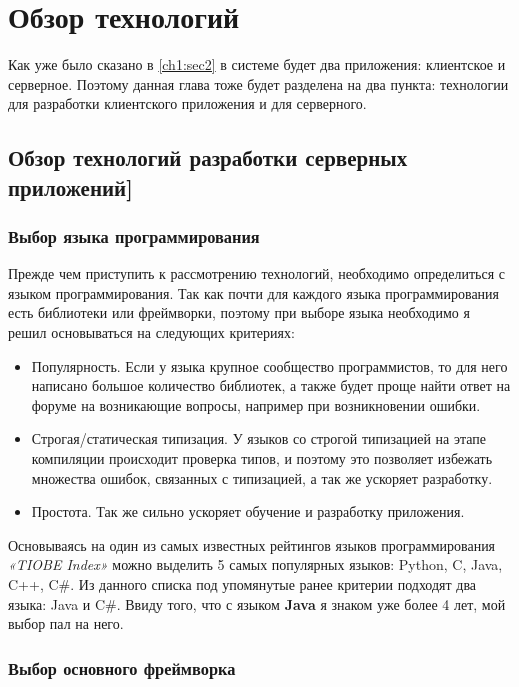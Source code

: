 \chapter{Обзор технологий} \label{ch2}
	
Как уже было сказано в \ref{ch1:sec2} в системе будет два приложения: клиентское и серверное. Поэтому данная глава тоже будет разделена на два пункта: технологии для разработки клиентского приложения и для серверного. 

\section{Обзор технологий разработки серверных приложений]} \label{ch2:sec1}

\subsection{Выбор языка программирования} \label{ch2:subsec11}

Прежде чем приступить к рассмотрению технологий, необходимо определиться с языком программирования. Так как почти для каждого языка программирования есть библиотеки или фреймворки, поэтому при выборе языка необходимо я решил основываться на следующих критериях:

\begin{itemize}
	\item Популярность. Если у языка крупное сообщество программистов, то для него написано большое количество библиотек, а также будет проще найти ответ на форуме на возникающие вопросы, например при возникновении ошибки.
	\item Строгая/статическая типизация. У языков со строгой типизацией на этапе компиляции происходит проверка типов, и поэтому это позволяет избежать множества ошибок, связанных с типизацией, а так же ускоряет разработку.  
	\item Простота. Так же сильно ускоряет обучение и разработку приложения.
\end{itemize}  

Основываясь на один из самых известных рейтингов языков программирования \textit{«TIOBE Index»}\cite{tiobe} можно выделить 5 самых популярных языков: Python, C, Java, C++, C\#. Из данного списка под упомянутые ранее критерии подходят два языка: Java и C\#. Ввиду того, что с языком \textbf{Java} я знаком уже более 4 лет, мой выбор пал на него.

\subsection{Выбор основного фреймворка} \label{ch2:subsec12}

